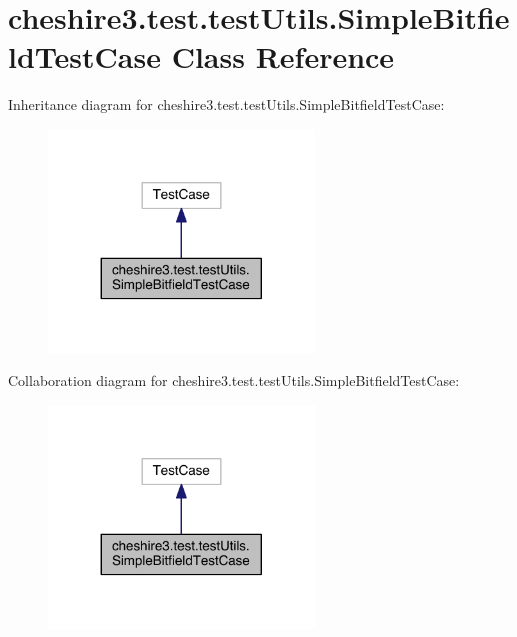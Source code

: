 \hypertarget{classcheshire3_1_1test_1_1test_utils_1_1_simple_bitfield_test_case}{\section{cheshire3.\-test.\-test\-Utils.\-Simple\-Bitfield\-Test\-Case Class Reference}
\label{classcheshire3_1_1test_1_1test_utils_1_1_simple_bitfield_test_case}
}


Inheritance diagram for cheshire3.\-test.\-test\-Utils.\-Simple\-Bitfield\-Test\-Case\-:
\nopagebreak
\begin{figure}[H]
\begin{center}
\leavevmode
\includegraphics[width=200pt]{classcheshire3_1_1test_1_1test_utils_1_1_simple_bitfield_test_case__inherit__graph}
\end{center}
\end{figure}


Collaboration diagram for cheshire3.\-test.\-test\-Utils.\-Simple\-Bitfield\-Test\-Case\-:
\nopagebreak
\begin{figure}[H]
\begin{center}
\leavevmode
\includegraphics[width=200pt]{classcheshire3_1_1test_1_1test_utils_1_1_simple_bitfield_test_case__coll__graph}
\end{center}
\end{figure}
